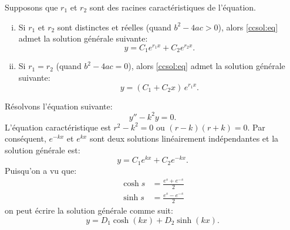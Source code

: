 \begin{theorem}
Supposons que $r_1$ et $r_2$ sont des racines caractéristiques de l'équation.
\begin{enumerate}[(i)]
\item Si $r_1$ et $r_2$ sont distinctes et réelles (quand $b^2 - 4ac > 0$),
alors \eqref{ccsol:eq} admet la solution générale suivante: 
\begin{equation*}
y = C_1 e^{r_1 x} + C_2 e^{r_2 x} .
\end{equation*}
\item Si $r_1 = r_2$ (quand $b^2 - 4ac = 0$), 
alors \eqref{ccsol:eq} admet la solution générale suivante:
\begin{equation*}
y = (C_1 + C_2 x)\, e^{r_1 x} .
\end{equation*}
\end{enumerate}
\end{theorem}

\begin{example} \label{example:expsecondorder}
Résolvons l'équation suivante:
\begin{equation*}
y'' - k^2 y = 0 .
\end{equation*}
L'équation caractéristique est $r^2 - k^2 = 0$ ou 
$(r-k)(r+k) = 0$.  Par conséquent, $e^{-k x}$ et $e^{kx}$ sont deux solutions linéairement indépendantes et la solution générale est:  
\begin{equation*}
y = C_1 e^{kx} + C_2e^{-kx} .
\end{equation*}
Puisqu'on a vu que:
\begin{align*}
\cosh s & = \frac{e^s+e^{-s}}{2} \\
\sinh s & = \frac{e^s-e^{-s}}{2}
\end{align*}
on peut écrire la solution générale comme suit:
\begin{equation*}
y = D_1 \cosh(kx) + D_2 \sinh(kx) .
\end{equation*}
\end{example}

